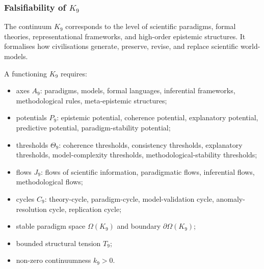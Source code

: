 
\subsubsection{Falsifiability of \texorpdfstring{$K_9$}{K_9}}
\label{sec:falsifiability-k9}

The continuum $K_9$ corresponds to the level of scientific paradigms,
formal theories, representational frameworks, and high-order epistemic
structures. It formalises how civilisations generate, preserve, revise,
and replace scientific world-models.

A functioning $K_9$ requires:

\begin{itemize}
    \item axes $A_9$: paradigms, models, formal languages,
          inferential frameworks, methodological rules,
          meta-epistemic structures;
    \item potentials $P_9$: epistemic potential, coherence potential,
          explanatory potential, predictive potential,
          paradigm-stability potential;
    \item thresholds $\Theta_9$: coherence thresholds,
          consistency thresholds, explanatory thresholds,
          model-complexity thresholds,
          methodological-stability thresholds;
    \item flows $J_9$: flows of scientific information,
          paradigmatic flows, inferential flows, methodological flows;
    \item cycles $C_9$: theory-cycle, paradigm-cycle,
          model-validation cycle, anomaly-resolution cycle,
          replication cycle;
    \item stable paradigm space $\Omega(K_9)$ and boundary $\partial\Omega(K_9)$;
    \item bounded structural tension $T_9$;
    \item non-zero continuumness $k_9>0$.
\end{itemize}


